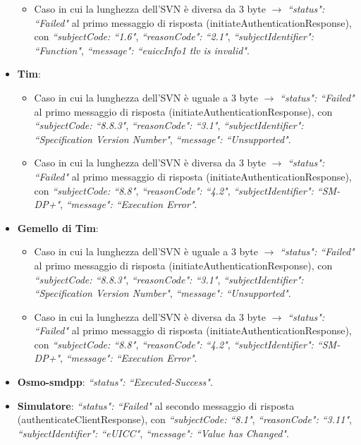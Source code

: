 \documentclass[10pt, oneside]{book}
\begin{document}
\begin{itemize}
\begin{itemize}
\item Caso in cui la lunghezza dell'SVN è diversa da 3 byte $\rightarrow$ \textit{``status": ``Failed"} al primo messaggio di risposta (initiateAuthenticationResponse), con \textit{``subjectCode: ``1.6"}, \textit{``reasonCode": ``2.1"}, \textit{``subjectIdentifier": ``Function"}, \textit{``message": ``euiccInfo1 tlv is invalid"}.
\end{itemize}
\item \textbf{Tim}:
\begin{itemize}
\item Caso in cui la lunghezza dell'SVN è uguale a 3 byte $\rightarrow$ \textit{``status": ``Failed"} al primo messaggio di risposta (initiateAuthenticationResponse), con \textit{``subjectCode: ``8.8.3"}, \textit{``reasonCode": ``3.1"}, \textit{``subjectIdentifier": ``Specification Version Number"}, \textit{``message": ``Unsupported"}.
\item Caso in cui la lunghezza dell'SVN è diversa da 3 byte $\rightarrow$ \textit{``status": ``Failed"} al primo messaggio di risposta (initiateAuthenticationResponse), con \textit{``subjectCode: ``8.8"}, \textit{``reasonCode": ``4.2"}, \textit{``subjectIdentifier": ``SM-DP+"}, \textit{``message": ``Execution Error"}.
\end{itemize}
\item \textbf{Gemello di Tim}:
\begin{itemize}
\item Caso in cui la lunghezza dell'SVN è uguale a 3 byte $\rightarrow$ \textit{``status": ``Failed"} al primo messaggio di risposta (initiateAuthenticationResponse), con \textit{``subjectCode: ``8.8.3"}, \textit{``reasonCode": ``3.1"}, \textit{``subjectIdentifier": ``Specification Version Number"}, \textit{``message": ``Unsupported"}.
\item Caso in cui la lunghezza dell'SVN è diversa da 3 byte $\rightarrow$ \textit{``status": ``Failed"} al primo messaggio di risposta (initiateAuthenticationResponse), con \textit{``subjectCode: ``8.8"}, \textit{``reasonCode": ``4.2"}, \textit{``subjectIdentifier": ``SM-DP+"}, \textit{``message": ``Execution Error"}.
\end{itemize}
\item \textbf{Osmo-smdpp}: \textit{``status": ``Executed-Success"}.
\item \textbf{Simulatore}: \textit{``status": ``Failed"} al secondo messaggio di risposta (authenticateClientResponse), con \textit{``subjectCode: ``8.1"}, \textit{``reasonCode": ``3.11"}, \textit{``subjectIdentifier": ``eUICC"}, \textit{``message": ``Value has Changed"}.
\end{itemize}
\end{document}
